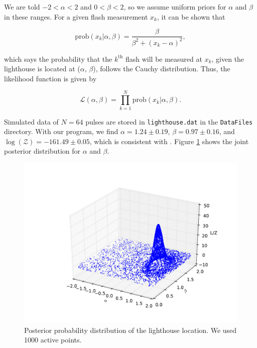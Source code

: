 \documentclass{article}
\def\mrm{\mathrm}
\begin{document}
 \vspace{0.2cm}
 
\noindent We are told $-2 < \alpha < 2$ and $0 < \beta < 2$, so we assume uniform priors for $\alpha$ and $\beta$ in these ranges. For a given flash measurement $x_k$, it can be shown that 

\begin{equation*}
\mrm{prob}(x_k | \alpha, \beta) = \frac{\beta}{\beta^2 + (x_k - \alpha)^2},
\end{equation*}

\noindent which says the probability that the $k^\mrm{th}$ flash will be measured at $x_k$, given the lighthouse is located at ($\alpha$, $\beta$), follows the Cauchy distribution. Thus, the likelihood function is given by

\begin{equation*}
\mathcal{L}(\alpha, \beta) = \prod_{k=1}^N \mrm{prob}(x_k | \alpha, \beta).
\end{equation*}

\noindent Simulated data of $N=64$ pulses are stored in {\tt lighthouse.dat} in the {\tt DataFiles} directory. With our program, we find $\alpha = 1.24 \pm 0.19$, $\beta = 0.97 \pm 0.16$, and $\log(\mathcal{Z}) =  -161.49 \pm 0.05$, which is consistent with \cite{Siv2006}. Figure \ref{fig:lighthouse} shows the joint posterior distribution for $\alpha$ and $\beta$. 

\begin{figure}[h]
\begin{center}
\includegraphics[width=12.0cm,trim=0cm 0cm 0cm 0cm,clip=true]{lighthouse}
\caption{Posterior probability distribution of the lighthouse location. We used 1000 active points.}
\label{fig:lighthouse}
\end{center}
\end{figure}
\end{document}
